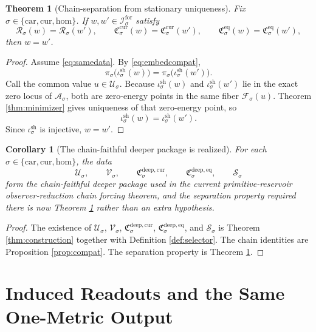 \documentclass[11pt]{article}
\newcommand{\Car}{\mathrm{car}}
\newcommand{\Cur}{\mathrm{cur}}
\newcommand{\Hom}{\mathrm{hom}}
\newcommand{\ForSpace}[1]{\mathcal I_{#1}^{\mathrm{for}}}
\newcommand{\Reduction}[1]{\mathcal R_{#1}}
\newcommand{\CurrentCarrier}[1]{\mathfrak C_{#1}^{\mathrm{cur}}}
\newcommand{\EqCarrier}[1]{\mathfrak C_{#1}^{\mathrm{eq}}}
\newcommand{\DataProj}[1]{\pi_{#1}}
\newcommand{\Fiber}[1]{\mathcal F_{#1}}
\newcommand{\ShellEmbed}[1]{\iota_{#1}^{\mathrm{sh}}}
\newcommand{\StationaryFunctional}[1]{\mathscr A_{#1}}
\newcommand{\DeepSpace}[1]{\mathcal U_{#1}}
\newcommand{\VisibleMap}[1]{\mathcal V_{#1}}
\newcommand{\DeepCurrentCarrier}[1]{\mathfrak C_{#1}^{\mathrm{deep,cur}}}
\newcommand{\DeepEqCarrier}[1]{\mathfrak C_{#1}^{\mathrm{deep,eq}}}
\newcommand{\ChainSelect}[1]{\mathcal S_{#1}}
\newtheorem{corollary}{Corollary}
\newtheorem{theorem}{Theorem}
\begin{document}
\begin{theorem}[Chain-separation from stationary uniqueness]
\label{thm:separation}
Fix \(\sigma\in\{\Car,\Cur,\Hom\}\). If \(w,w'\in\ForSpace{\sigma}\) satisfy
\begin{equation}
\Reduction{\sigma}(w)=\Reduction{\sigma}(w'),
\qquad
\CurrentCarrier{\sigma}(w)=\CurrentCarrier{\sigma}(w'),
\qquad
\EqCarrier{\sigma}(w)=\EqCarrier{\sigma}(w'),
\label{eq:samedata}
\end{equation}
then \(w=w'\).
\end{theorem}

\begin{proof}
Assume \eqref{eq:samedata}. By \eqref{eq:embedcompat},
\[
\DataProj{\sigma}\bigl(\ShellEmbed{\sigma}(w)\bigr)
=
\DataProj{\sigma}\bigl(\ShellEmbed{\sigma}(w')\bigr).
\]
Call the common value \(u\in\DeepSpace{\sigma}\). Because \(\ShellEmbed{\sigma}(w)\) and \(\ShellEmbed{\sigma}(w')\) lie in the exact zero locus of \(\StationaryFunctional{\sigma}\), both are zero-energy points in the same fiber \(\Fiber{\sigma}(u)\). Theorem \ref{thm:minimizer} gives uniqueness of that zero-energy point, so
\[
\ShellEmbed{\sigma}(w)=\ShellEmbed{\sigma}(w').
\]
Since \(\ShellEmbed{\sigma}\) is injective, \(w=w'\).
\end{proof}

\begin{corollary}[The chain-faithful deeper package is realized]
\label{cor:chainfaithful}
For each \(\sigma\in\{\Car,\Cur,\Hom\}\), the data
\[
\DeepSpace{\sigma},\qquad
\VisibleMap{\sigma},\qquad
\DeepCurrentCarrier{\sigma},\qquad
\DeepEqCarrier{\sigma},\qquad
\ChainSelect{\sigma}
\]
form the chain-faithful deeper package used in the current primitive-reservoir observer-reduction chain forcing theorem, and the separation property required there is now Theorem \ref{thm:separation} rather than an extra hypothesis.
\end{corollary}

\begin{proof}
The existence of \(\DeepSpace{\sigma}\), \(\VisibleMap{\sigma}\), \(\DeepCurrentCarrier{\sigma}\), \(\DeepEqCarrier{\sigma}\), and \(\ChainSelect{\sigma}\) is Theorem \ref{thm:construction} together with Definition \ref{def:selector}. The chain identities are Proposition \ref{prop:compat}. The separation property is Theorem \ref{thm:separation}.
\end{proof}

\section{Induced Readouts and the Same One-Metric Output}
\end{document}
